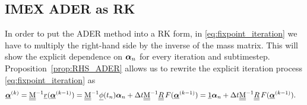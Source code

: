 \subsection{IMEX ADER as RK}
In order to put the ADER method into a RK form, in \eqref{eq:fixpoint_iteration} we have to multiply the right-hand side by the inverse of the mass matrix. This will show the explicit dependence on $\boldsymbol{\alpha}_n$ for every iteration and subtimestep. 
Proposition~\ref{prop:RHS_ADER} allows us to rewrite the explicit iteration process \eqref{eq:fixpoint_iteration} as
\begin{equation}\label{eq: ADER_RK_step}
\begin{aligned}
\vec{\bc}^{(k)} = \M^{-1}\vec{r}(\vec{\bc}^{(k-1)})& =\M^{-1}\vec{\phi}(t_n) \bc_n + \Delta t \M^{-1}\mat{R} F(\vec{\bc}^{(k-1)})
=\vec{1} \bc_n + \Delta t \M^{-1}\mat{R} F(\vec{\bc}^{(k-1)}).
\end{aligned}
\end{equation}

